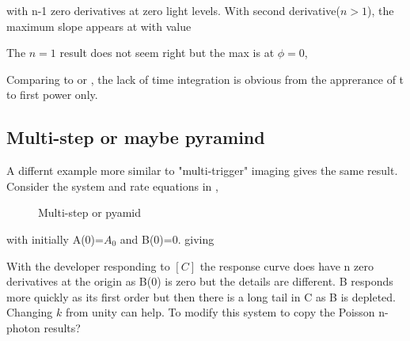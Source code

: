 with n-1 zero derivatives at zero light levels.
With second derivative($n>1$), 
the maximum slope appears at  
with value 

The $n=1$ result does not seem right but the max is at $\phi=0$, 

Comparing   to  or , the lack of time integration is obvious from the apprerance of t to first power only. 

 





\subsection{ Multi-step or maybe pyramind }
A differnt example more similar to "multi-trigger" imaging gives the
same result.
Consider the system and  rate equations in ,

\begin{figure}[htb]
\centering






\caption{ Multi-step or pyamid }
\label{fig:pyramid} 
\end{figure}


with initially A(0)=$A_0$ and B(0)=0.
giving 

With the developer responding to $[C]$ the response curve does have
n zero derivatives at the origin as B(0) is zero but the details
are different. B responds more quickly as its first order but then
there is a long tail in C as B is depleted. 
Changing $k$ from unity can help. 
To modify this system
to copy the Poisson n-photon results?  


